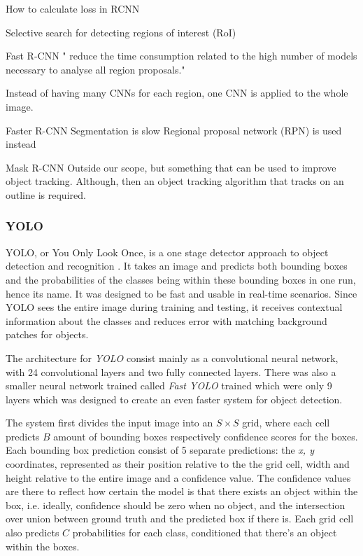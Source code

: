 How to calculate loss in RCNN

Selective search for detecting regions of interest (RoI)

Fast R-CNN
" reduce the time consumption related to the high number of models necessary to analyse all region proposals."

Instead of having many CNNs for each region, one CNN is applied to the whole image.

Faster R-CNN
Segmentation is slow
Regional proposal network (RPN) is used instead

Mask R-CNN
Outside our scope, but something that can be used to improve object tracking.
Although, then an object tracking algorithm that tracks on an outline is required.

\subsubsection{YOLO}
YOLO, or You Only Look Once, is a one stage detector approach to object detection and
 recognition \cite{YOLO1}. It takes an image and predicts both bounding boxes and the probabilities of the classes being within these bounding boxes in one run, hence its name. It was designed to be fast and usable in real-time scenarios. Since YOLO sees the entire image during training and testing, it receives contextual information about the classes and reduces error with matching background patches for objects. 
 
 The architecture for \textit{YOLO} consist mainly as a convolutional neural network, with 24 convolutional layers and two fully connected layers. There was also a smaller neural network trained called \textit{Fast YOLO} trained which were only 9 layers which was designed to create an even faster system for object detection. 
 
 The system first divides the input image into an  $S \times S$  grid, where each cell predicts $B$ amount of bounding boxes respectively confidence scores for the boxes. Each bounding box prediction consist of 5 separate predictions: the \textit{x, y} coordinates, represented as their position relative to the the grid cell, width and height relative to the entire image and a confidence value. The confidence values are there to reflect how certain the model is that there exists an object within the box, i.e. ideally, confidence should be zero when no object, and the intersection over union between ground truth and the predicted box if there is. Each grid cell also predicts $C$ probabilities for each class, conditioned that there's an object within the boxes. 
 
